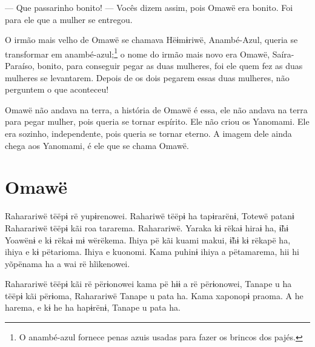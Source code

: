 --- Que passarinho bonito! --- Vocês dizem assim, pois Omawë era bonito.
Foi para ele que a mulher se entregou. 

O irmão mais velho de Omawë se chamava Hëɨmɨriwë, Anambé-Azul, queria se transformar em
anambé-azul;\footnote{O anambé-azul fornece penas azuis usadas para fazer os brincos dos
pajés.} o nome do irmão mais novo era Omawë,
Saíra-Paraíso, bonito, para conseguir pegar as duas mulheres, foi ele
quem fez as duas mulheres se levantarem. Depois de os dois pegarem essas
duas mulheres, não perguntem o que aconteceu! 


Omawë não andava na terra, a história de Omawë é essa, ele não
andava na terra para pegar mulher, pois queria se tornar espírito. Ele
não criou os Yanomami. Ele era sozinho, independente, pois queria se
tornar eterno. A imagem dele ainda chega aos Yanomami, é ele que se
chama Omawë.

\chapter{Omawë}

  

Raharariwë tëëpɨ rë yupɨrenowei. Rahariwë tëëpɨ ha tapɨrarënɨ, Totewë
patanɨ Raharariwë tëëpɨ kãi roa tararema. Raharariwë. Yaraka kɨ rëkaɨ
hiraɨ ha, ɨ̃hɨ Yoawënɨ e kɨ rëkaɨ mɨ wërëkema. Ihiya pë kãi kuami makui,
ɨ̃hɨ kɨ rëkapë ha, ihiya e kɨ pëtarioma. Ihiya e kuonomi. Kama puhinɨ
ihiya a pëtamarema, hii hi yõpënama ha a wai rë hĩikenowei. 

Raharariwë tëëpɨ kãi rë përɨonowei kama pë hɨɨ a rë përɨonowei, Tanape u
ha tëëpɨ kãi përɨoma, Raharariwë Tanape u pata ha. Kama xaponopɨ praoma.
A he harema, e kɨ he ha hapɨrënɨ, Tanape u pata ha. 


